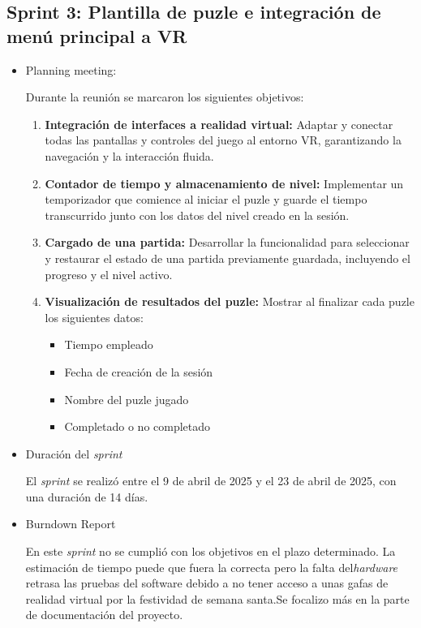 \subsection{\textbf{Sprint 3: Plantilla de puzle e integración de menú principal a VR } }
\begin{itemize}
    \item {Planning meeting:}
    
Durante la reunión se marcaron los siguientes objetivos:
\begin{enumerate}
  \item \textbf{Integración de interfaces a realidad virtual:}  
    Adaptar y conectar todas las pantallas y controles del juego al entorno VR, garantizando la navegación y la interacción fluida.

  \item \textbf{Contador de tiempo y almacenamiento de nivel:}  
    Implementar un temporizador que comience al iniciar el puzle y guarde el tiempo transcurrido junto con los datos del nivel creado en la sesión.

  \item \textbf{Cargado de una partida:}  
    Desarrollar la funcionalidad para seleccionar y restaurar el estado de una partida previamente guardada, incluyendo el progreso y el nivel activo.

  \item \textbf{Visualización de resultados del puzle:}  
    Mostrar al finalizar cada puzle los siguientes datos:  
    \begin{itemize}
      \item Tiempo empleado  
      \item Fecha de creación de la sesión  
      \item Nombre del puzle jugado
      \item Completado o no completado
    \end{itemize}
\end{enumerate}
    \item {Duración del \textit{sprint}}
    
El \textit{sprint } se realizó entre el 9 de abril de 2025 y el 23 de abril de 2025, con una duración de 14 días.
    \item {Burndown Report}
    
En este \textit{sprint} no se cumplió con los objetivos en el plazo determinado. La estimación de tiempo puede que fuera la correcta pero la falta del\textit{hardware} retrasa las pruebas del software debido a no tener acceso a unas gafas de realidad virtual por la festividad de semana santa.Se focalizo más en la parte de documentación del proyecto.

\end{itemize}

